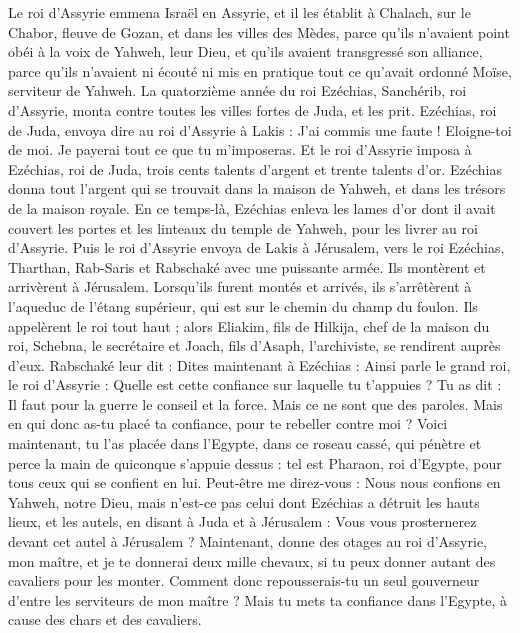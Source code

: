 \begin{multicols}{2}
Le roi d’Assyrie emmena Israël en Assyrie, et il les établit à Chalach, sur le Chabor, fleuve de Gozan, et dans les villes des Mèdes,
parce qu’ils n’avaient point obéi à la voix de Yahweh, leur Dieu, et qu’ils avaient transgressé son alliance, parce qu’ils n’avaient ni écouté ni mis en pratique tout ce qu’avait ordonné Moïse, serviteur de Yahweh.
La quatorzième année du roi Ezéchias, Sanchérib, roi d’Assyrie, monta contre toutes les villes fortes de Juda, et les prit.
Ezéchias, roi de Juda, envoya dire au roi d’Assyrie à Lakis : J’ai commis une faute ! Eloigne-toi de moi. Je payerai tout ce que tu m’imposeras. Et le roi d’Assyrie imposa à Ezéchias, roi de Juda, trois cents talents d’argent et trente talents d’or.
Ezéchias donna tout l’argent qui se trouvait dans la maison de Yahweh, et dans les trésors de la maison royale.
En ce temps-là, Ezéchias enleva les lames d’or dont il avait couvert les portes et les linteaux du temple de Yahweh, pour les livrer au roi d’Assyrie.
Puis le roi d’Assyrie envoya de Lakis à Jérusalem, vers le roi Ezéchias, Tharthan, Rab-Saris et Rabschaké avec une puissante armée. Ils montèrent et arrivèrent à Jérusalem. Lorsqu’ils furent montés et arrivés, ils s’arrêtèrent à l’aqueduc de l’étang supérieur, qui est sur le chemin du champ du foulon.
Ils appelèrent le roi tout haut ; alors Eliakim, fils de Hilkija, chef de la maison du roi, Schebna, le secrétaire et Joach, fils d’Asaph, l’archiviste, se rendirent auprès d’eux.
Rabschaké leur dit : Dites maintenant à Ezéchias : Ainsi parle le grand roi, le roi d’Assyrie : Quelle est cette confiance sur laquelle tu t’appuies ?
Tu as dit : Il faut pour la guerre le conseil et la force. Mais ce ne sont que des paroles. Mais en qui donc as-tu placé ta confiance, pour te rebeller contre moi ?
Voici maintenant, tu l’as placée dans l’Egypte, dans ce roseau cassé, qui pénètre et perce la main de quiconque s’appuie dessus : tel est Pharaon, roi d’Egypte, pour tous ceux qui se confient en lui.
Peut-être me direz-vous : Nous nous confions en Yahweh, notre Dieu, mais n’est-ce pas celui dont Ezéchias a détruit les hauts lieux, et les autels, en disant à Juda et à Jérusalem : Vous vous prosternerez devant cet autel à Jérusalem ?
Maintenant, donne des otages au roi d’Assyrie, mon maître, et je te donnerai deux mille chevaux, si tu peux donner autant des cavaliers pour les monter.
Comment donc repousserais-tu un seul gouverneur d’entre les serviteurs de mon maître ? Mais tu mets ta confiance dans l’Egypte, à cause des chars et des cavaliers.

\end{multicols}
